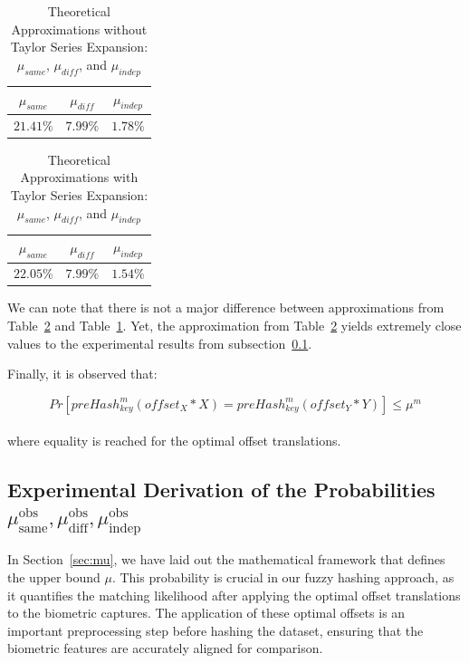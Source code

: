 \begin{table}[H]
    \centering
    \renewcommand{\arraystretch}{1.25}\begin{tabular}{|c|c|c|}
        \hline
        $\mu_{same}$ & $\mu_{diff}$ & $\mu_{indep}$\\
        \hline
        $21.41\%$ & $7.99\%$ & $1.78\%$\\
        \hline
    \end{tabular}
\caption{Theoretical Approximations without Taylor Series Expansion: $\mu_{same}$, $\mu_{diff}$, and $\mu_{indep}$}
\label{tab:mu_approx}
\end{table}


\begin{table}[H]
    \centering
    \renewcommand{\arraystretch}{1.25}\begin{tabular}{|c|c|c|}
        \hline
        $\mu_{same}$ & $\mu_{diff}$ & $\mu_{indep}$\\
        \hline
        $22.05\%$ & $7.99\%$ & $1.54\%$\\
        \hline
    \end{tabular}
\caption{Theoretical Approximations with Taylor Series Expansion: $\mu_{same}$, $\mu_{diff}$, and $\mu_{indep}$}
\label{tab:approximation_mu_taylor}
\end{table}

We can note that there is not a major difference between approximations from Table~\ref{tab:approximation_mu_taylor} and Table~\ref{tab:mu_approx}. Yet, the approximation from Table~\ref{tab:approximation_mu_taylor} yields extremely close values to the experimental results from subsection~\ref{sec:experiment_fuzzy_hash}.

Finally, it is observed that:

\begin{equation}
    Pr[preHash_{key}^m(offset_X * X) = preHash_{key}^m(offset_Y * Y)] \leq \mu^m
\end{equation}
\\
where equality is reached for the optimal offset translations.

\subsection{Experimental Derivation of the Probabilities \(\mu_{\text{same}}^{\text{obs}}, \mu_{\text{diff}}^{\text{obs}}, \mu_{\text{indep}}^{\text{obs}}\)}
\label{sec:experiment_fuzzy_hash}

In Section~\ref{sec:mu}, we have laid out the mathematical framework that defines the upper bound \(\mu\). This probability is crucial in our fuzzy hashing approach, as it quantifies the matching likelihood after applying the optimal offset translations to the biometric captures. The application of these optimal offsets is an important preprocessing step before hashing the dataset, ensuring that the biometric features are accurately aligned for comparison.

